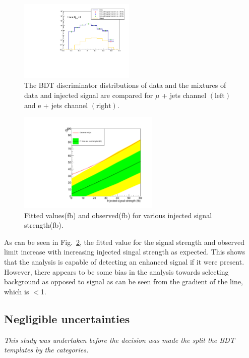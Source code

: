 \begin{figure}[ht!]
     \includegraphics[width=0.49\textwidth]{images/Run1/SignalInjection_El_8j.pdf}          
    \caption{The BDT discriminator distributions of data and the mixtures of data and injected signal are compared for $\mu$ + jets channel $\left( \textrm{left} \right)$ and e + jets channel $\left( \textrm{right} \right)$. }
    \label{fig:SigInjection}
\end{figure}

\begin{figure}[!ht]
\centering
    \includegraphics[width=0.6\textwidth]{images/Run1/SignalInjection_JS_Brazil.pdf}
    \caption{Fitted values(fb) and observed(fb) for various injected signal strength(fb).}
    \label{fig:SigInjectionBrazil}
\end{figure}

As can be seen in Fig.~\ref{fig:SigInjectionBrazil}, the fitted value for the signal strength and observed limit increase with increasing injected singal strength as expected. This shows that the analysis is capable of detecting an enhanced signal if it were present. However, there appears to be some bias in the analysis towards selecting background as opposed to signal as can be seen from the gradient of the line, which is $<$1.


\subsection{Negligible uncertainties}
\emph{This study was undertaken before the decision was made the split the BDT templates by the \njets categories.}

